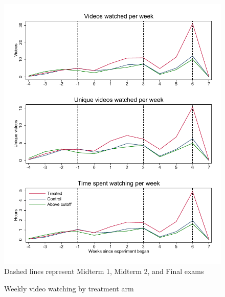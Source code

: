 \documentclass[12pt]{article}
\begin{document}
\clearpage
\begin{figure}[t]
\begin{center}
\caption{Weekly video watching by treatment arm}
\label{timeseries}
\includegraphics[width=1\textwidth, angle=0]{../plots/tscombo.pdf}
\footnotesize Dashed lines represent Midterm 1, Midterm 2, and Final exams
\end{center}
\end{figure}
\end{document}
